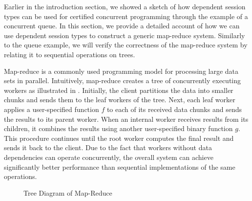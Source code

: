 Earlier in the introduction section, we showed a sketch of how dependent session types
can be used for certified concurrent programming through the example of a concurrent queue.
In this section, we provide a detailed account of how we can use dependent session types
to construct a generic map-reduce system. Similarly to the queue example, we will verify
the correctness of the map-reduce system by relating it to sequential operations on trees.

Map-reduce is a commonly used programming model for processing large data sets in parallel.
Intuitively, map-reduce creates a tree of concurrently executing workers as illustrated in
. Initially, the client partitions the data into smaller chunks and sends them to
the leaf workers of the tree. Next, each leaf worker applies a user-specified
function $f$ to each of its received data chunks and sends the results to its parent worker.
When an internal worker receives results from its children, it combines the results using another
user-specified binary function $g$. This procedure continues until the root worker computes
the final result and sends it back to the client. Due to the fact that workers without
data dependencies can operate concurrently, the overall system can achieve significantly better
performance than sequential implementations of the same operations.
\vspace{-0.3em}
\begin{figure}[H]
\vspace{-0.5em}
\caption{Tree Diagram of Map-Reduce}
\label{fig:map-reduce}
\end{figure}

